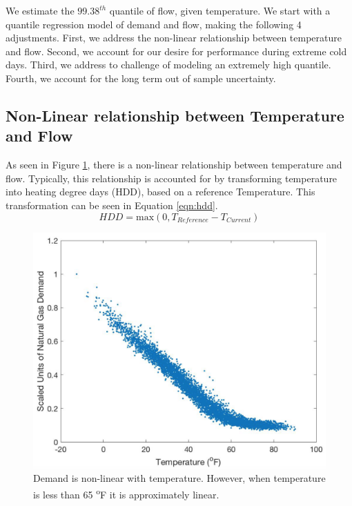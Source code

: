 \documentclass{article}
\begin{document}
We estimate the $99.38^{th}$ quantile of flow, given temperature. We start with a quantile regression model of demand and flow, making the following 4 adjustments. First, we address the non-linear relationship between temperature and flow. Second, we account for our desire for performance during extreme cold days. Third, we address to challenge of modeling an extremely high quantile. Fourth, we account for the long term out of sample uncertainty.

\subsection{Non-Linear relationship between Temperature and Flow}

As seen in Figure \ref{fig:scatterTempAndFlow}, there is a non-linear relationship between temperature and flow. Typically, this relationship is accounted for by transforming temperature into heating degree days (HDD), based on a reference Temperature. This transformation can be seen in Equation \ref{eqn:hdd}. 
\begin{equation}
    HDD= \mbox{max}(0, T_{Reference}-T_{Current})
    \label{eqn:hdd}
\end{equation}

\begin{figure} \label{fig:scatterTempAndFlow}
	\centering
	\includegraphics[scale=0.4]{nonlinear.png}
	\caption{Demand is non-linear with temperature. However, when temperature is less than 65 \textsuperscript{o}F it is approximately linear.}
\end{figure}
\end{document}
